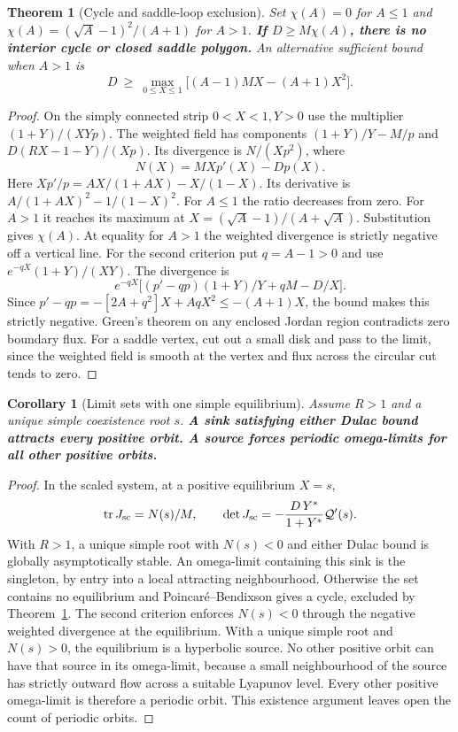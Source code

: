 \documentclass[12pt,a4paper,twoside,fleqn]{article}
\theoremstyle{journal}
\newtheorem{theorem}{Theorem}
\newtheorem{corollary}{Corollary}
\newcommand{\claim}[1]{{\normalfont\bfseries\boldmath #1}}
\newcommand{\tr}{\operatorname{tr}}
\newcommand{\Q}{\mathcal Q}
\begin{document}
\begin{theorem}[Cycle and saddle-loop exclusion]\label{thm:dulac}
Set \(\chi(A)=0\) for \(A\le1\) and \(\chi(A)=(\sqrt A-1)^2/(A+1)\) for \(A>1\). \claim{If \(D\ge M\chi(A)\), there is no interior cycle or closed saddle polygon.} An alternative sufficient bound when \(A>1\) is
\[
 D\ \ge\ \max_{0\le X\le1}\big[(A-1)MX-(A+1)X^2\big].
\]
\end{theorem}
\begin{proof}
On the simply connected strip \(0<X<1,Y>0\) use the multiplier \((1+Y)/(XYp)\). The weighted field has components \((1+Y)/Y-M/p\) and \(D(RX-1-Y)/(Xp)\). Its divergence is \(N/(Xp^2)\), where
\begin{equation}\label{eq:N}
 N(X)=MXp'(X)-Dp(X).
\end{equation}
Here \(Xp'/p=AX/(1+AX)-X/(1-X)\). Its derivative is \(A/(1+AX)^2-1/(1-X)^2\). For \(A\le1\) the ratio decreases from zero. For \(A>1\) it reaches its maximum at \(X=(\sqrt A-1)/(A+\sqrt A)\). Substitution gives \(\chi(A)\). At equality for \(A>1\) the weighted divergence is strictly negative off a vertical line. For the second criterion put \(q=A-1>0\) and use \(e^{-qX}(1+Y)/(XY)\). The divergence is
\[
 e^{-qX}\big[(p'-qp)(1+Y)/Y+qM-D/X\big].
\]
Since \(p'-qp=-[2A+q^2]X+AqX^2\le-(A+1)X\), the bound makes this strictly negative. Green's theorem on any enclosed Jordan region contradicts zero boundary flux. For a saddle vertex, cut out a small disk and pass to the limit, since the weighted field is smooth at the vertex and flux across the circular cut tends to zero.
\end{proof}

\begin{corollary}[Limit sets with one simple equilibrium]\label{cor:pb}
Assume \(R>1\) and a unique simple coexistence root \(s\).
\claim{A sink satisfying either Dulac bound attracts every positive orbit. A source forces periodic omega-limits for all other positive orbits.}
\end{corollary}
\begin{proof}
In the scaled system, at a positive equilibrium \(X=s\),
\[
 \tr J_{\rm sc}=N(s)/M,\qquad
 \det J_{\rm sc}=-\frac{D\,Y^*}{1+Y^*}\Q'(s).
\]
With \(R>1\), a unique simple root with \(N(s)<0\) and either Dulac bound is globally asymptotically stable. An omega-limit containing this sink is the singleton, by entry into a local attracting neighbourhood. Otherwise the set contains no equilibrium and Poincar\'e--Bendixson gives a cycle, excluded by Theorem~\ref{thm:dulac}. The second criterion enforces \(N(s)<0\) through the negative weighted divergence at the equilibrium. With a unique simple root and \(N(s)>0\), the equilibrium is a hyperbolic source. No other positive orbit can have that source in its omega-limit, because a small neighbourhood of the source has strictly outward flow across a suitable Lyapunov level. Every other positive omega-limit is therefore a periodic orbit. This existence argument leaves open the count of periodic orbits.

\end{proof}
\end{document}
